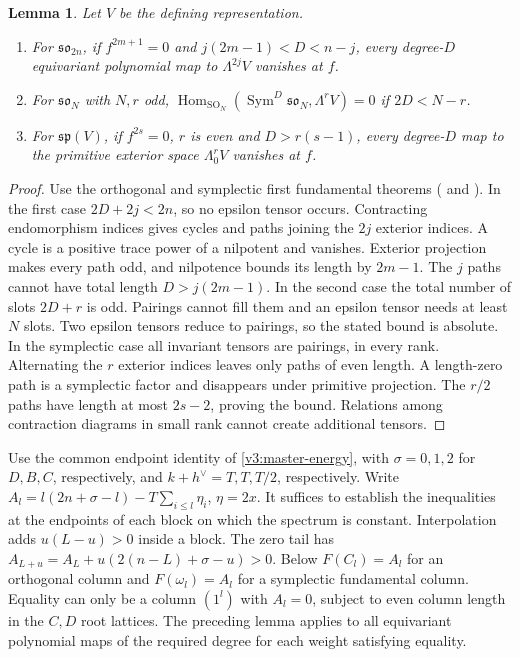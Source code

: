 \documentclass[11pt,a4paper]{amsart}
\numberwithin{equation}{section}
\newtheorem{lemma}[theorem]{Lemma}
\theoremstyle{definition}
\theoremstyle{remark}
\newcommand{\spg}{\mathfrak{sp}}
\newcommand{\sog}{\mathfrak{so}}
\newcommand{\Hom}{\operatorname{Hom}}
\newcommand{\Sym}{\operatorname{Sym}}
\begin{document}
\begin{lemma}\label{seed:covariants}
Let $V$ be the defining representation.
\begin{enumerate}
\item For $\sog_{2n}$, if $f^{2m+1}=0$ and
$j(2m-1)<D<n-j$, every degree-$D$ equivariant polynomial map to
$\Lambda^{2j}V$ vanishes at $f$.
\item For $\sog_N$ with $N,r$ odd,
$\Hom_{\mathrm{SO}_N}(\Sym^D\sog_N,\Lambda^rV)=0$ if $2D<N-r$.
\item For $\spg(V)$, if $f^{2s}=0$, $r$ is even and
$D>r(s-1)$, every degree-$D$ map to the primitive exterior space
$\Lambda^r_0V$ vanishes at $f$.
\end{enumerate}
\end{lemma}
\begin{proof}
Use the orthogonal and symplectic first fundamental theorems
(\cite[arXiv v1, Theorem~2.1]{LehrerZhang2017} and \cite[arXiv v1, Theorem~4.8]{LehrerZhang2015}).
In the first case $2D+2j<2n$, so no epsilon tensor occurs. Contracting
endomorphism indices gives cycles and paths joining the $2j$ exterior indices.
A cycle is a positive trace power of a nilpotent and vanishes. Exterior
projection makes every path odd, and nilpotence bounds its length by
$2m-1$. The $j$ paths cannot have total length $D>j(2m-1)$.
In the second case the total number of slots $2D+r$ is odd. Pairings
cannot fill them and an epsilon tensor needs at least $N$ slots.
Two epsilon tensors reduce to pairings, so the stated bound is absolute.
In the symplectic case all invariant tensors are pairings, in every
rank. Alternating the $r$ exterior indices leaves only paths of even length.
A length-zero path is a
symplectic factor and disappears under primitive projection. The $r/2$
paths have length at most $2s-2$, proving the bound. Relations among
contraction diagrams in small rank cannot create additional tensors.
\end{proof}

Use the common endpoint identity of \cref{v3:master-energy}, with
$\sigma=0,1,2$ for $D,B,C$, respectively, and
$k+h^\vee=T,T,T/2$, respectively.
Write $A_l=l(2n+\sigma-l)-T\sum_{i\le l}\eta_i$, $\eta=2x$.
It suffices to establish the inequalities at the endpoints of each
block on which the spectrum is constant. Interpolation
adds $u(L-u)>0$ inside a block. The zero tail has
$A_{L+u}=A_L+u(2(n-L)+\sigma-u)>0$.
Below $F(C_l)=A_l$ for an orthogonal column and $F(\omega_l)=A_l$
for a symplectic fundamental column. Equality can only be a column $(1^l)$ with $A_l=0$, subject to even
column length in the $C,D$ root lattices. The preceding lemma applies
to all equivariant polynomial maps of the required degree for each
weight satisfying equality.
\label{seed:D-columns}\label{seed:B-columns}\label{seed:C-columns}
\end{document}
